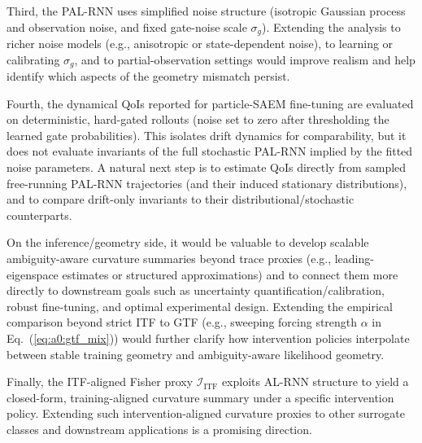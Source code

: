 \documentclass[twoside]{article}
\theoremstyle{plain}
\theoremstyle{definition}
\theoremstyle{remark}
\begin{document}
Third, the PAL-RNN uses simplified noise structure (isotropic Gaussian process and observation noise, and fixed gate-noise scale $\sigma_g$). Extending the analysis to richer noise models (e.g., anisotropic or state-dependent noise), to learning or calibrating $\sigma_g$, and to partial-observation settings would improve realism and help identify which aspects of the geometry mismatch persist.

Fourth, the dynamical QoIs reported for particle-SAEM fine-tuning are evaluated on deterministic, hard-gated rollouts (noise set to zero after thresholding the learned gate probabilities). This isolates drift dynamics for comparability, but it does not evaluate invariants of the full stochastic PAL-RNN implied by the fitted noise parameters. A natural next step is to estimate QoIs directly from sampled free-running PAL-RNN trajectories (and their induced stationary distributions), and to compare drift-only invariants to their distributional/stochastic counterparts.

On the inference/geometry side, it would be valuable to develop scalable ambiguity-aware curvature summaries beyond trace proxies (e.g., leading-eigenspace estimates or structured approximations) and to connect them more directly to downstream goals such as uncertainty quantification/calibration, robust fine-tuning, and optimal experimental design. Extending the empirical comparison beyond strict ITF to GTF (e.g., sweeping forcing strength $\alpha$ in Eq.~(\ref{eq:a0:gtf_mix})) would further clarify how intervention policies interpolate between stable training geometry and ambiguity-aware likelihood geometry.

Finally, the ITF-aligned Fisher proxy $\bm{\mathcal I}_{\mathrm{ITF}}$ exploits AL-RNN structure to yield a closed-form, training-aligned curvature summary under a specific intervention policy. Extending such intervention-aligned curvature proxies to other surrogate classes and downstream applications is a promising direction.
\end{document}
